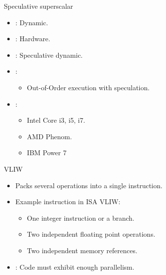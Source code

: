 \begin{frame}[t]{Speculative superscalar}
\begin{itemize}
  \item {}: Dynamic.
  \item {}: Hardware.
  \item {}: Speculative dynamic.
  \item {}:
    \begin{itemize}
      \item Out-of-Order execution with speculation.
    \end{itemize}
  
  \item {}: 
    \begin{itemize}
      \item Intel Core i3, i5, i7. 
      \item AMD Phenom. 
      \item IBM Power 7
    \end{itemize}
\end{itemize}
\end{frame}

\begin{frame}[t]{VLIW}
\begin{itemize}
  \item Packs several operations into a single instruction.

  \item Example instruction in ISA VLIW:
    \begin{itemize}
      \item One integer instruction or a branch.
      \item Two independent floating point operations.
      \item Two independent memory references.
    \end{itemize}

  \item {}: Code must exhibit enough parallelism.
\end{itemize}
\end{frame}

